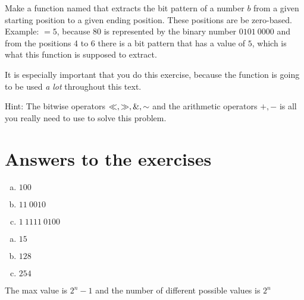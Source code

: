 \begin{Exercise}[label={getbits}]

  Make a function named  that extracts
  the bit pattern of a number $b$ from a given starting position to a
  given ending position. These positions are be zero-based. Example:
  $=5$, because $80$ is represented by the
  binary number $0101\ 0000$ and from the positions 4 to 6 there is a
  bit pattern that has a value of $5$, which is what this function is
  supposed to extract.

  It is especially important that you do this exercise, because the
  function  is going to be used \textit{a lot}
  throughout this text.

  Hint: The bitwise operators $\ll, \gg, \mathrel{\&},
  \mathord{\sim}$ and the arithmetic operators $+,-$ is all you really need to
  use to solve this problem.

\end{Exercise}

\section{Answers to the exercises}

\begin{Answer}[ref={n-to-bin}]
  \begin{enumerate}[(a)]
  \item $100$
  \item $11\ 0010$
  \item $1\ 1111\ 0100$
  \end{enumerate}
\end{Answer}

\begin{Answer}[ref={bin-to-n}]
  \begin{enumerate}[(a)]
  \item $15$
  \item $128$
  \item $254$
  \end{enumerate}
\end{Answer}

\begin{Answer}[ref={n-bits-max-val}]
  The max value is $2^n - 1$ and the number of different possible
  values is $2^n$
\end{Answer}

